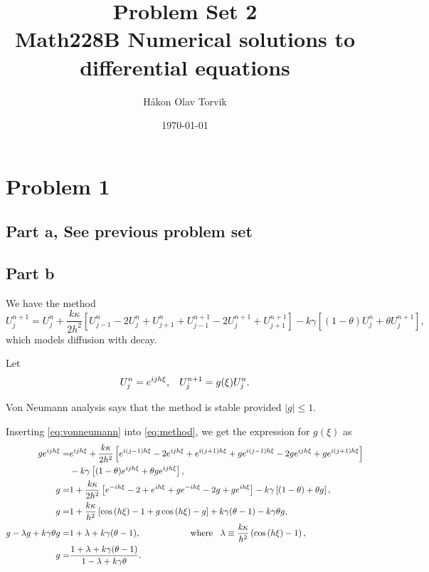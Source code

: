 \documentclass[aps, 12pt]{revtex4}
\begin{document}
\author{Håkon Olav Torvik}
\title{\Huge Problem Set 2 \\ \small Math228B Numerical solutions to differential equations}
\date{\today}


\maketitle

\section*{Problem 1}
\subsection*{Part a, See previous problem set}

\subsection*{Part b}
We have the method
\begin{equation}\label{eq:method}
    U_j^{n+1} = U_j^n + \frac{k\kappa}{2h^2}\left[U_{j-1}^n - 2U_j^n + U_{j+1}^n + U_{j-1}^{n+1} -2U_j^{n+1}+U_{j+1}^{n+1} \right] - k\gamma \left[(1-\theta)U_j^n+\theta U_j^{n+1}\right],
\end{equation}
which models diffusion with decay.

Let
\begin{equation}\label{eq:vonneumann}
    U_j^n = e^{ijh\xi}, \hspace{3mm} U_j^{n+1} = g(\xi)U_j^n.
\end{equation}

Von Neumann analysis says that the method is stable provided $|g|\leq 1$.

Inserting \eqref{eq:vonneumann} into \eqref{eq:method}, we get the expression for $g(\xi)$ as
\begin{align*}
    ge^{ijh\xi} =                     & e^{ijh\xi} + \frac{k\kappa}{2h^2}\left[e^{i(j-1)h\xi} - 2e^{ijh\xi} + e^{i(j+1)h\xi} + ge^{i(j-1)h\xi} - 2ge^{ijh\xi} + ge^{i(j+1)h\xi} \right]
    \\
                                      & - k\gamma \left[(1-\theta)e^{ijh\xi}+\theta ge^{ijh\xi}\right],
    \\
    g =                               & 1 + \frac{k\kappa}{2h^2}\left[e^{-ih\xi}-2+e^{ih\xi} +ge^{-ih\xi} - 2g + ge^{ih\xi} \right] - k\gamma\left[(1-\theta)+\theta g\right],
    \\
    g =                               & 1 + \frac{k\kappa}{h^2}\left[\cos{(h\xi)} -1 + g\cos{(h\xi)}-g\right] + k\gamma(\theta-1)-k\gamma\theta g,
    \\
    g - \lambda g + k\gamma\theta g = & 1 + \lambda +k\gamma(\theta-1), \hspace{20mm} \text{where} \hspace{3mm} \lambda \equiv \frac{k\kappa}{h^2}\left(\cos{(h\xi)}-1\right),
    \\
    g =                               & \frac{1+\lambda +k\gamma(\theta - 1)}{1-\lambda +k\gamma\theta}.
\end{align*}
\end{document}
